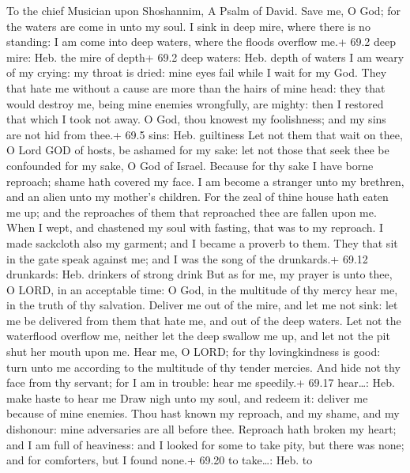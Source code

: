 To the chief Musician upon Shoshannim, A Psalm of David. 
Save me, O God; for the waters are come in unto my soul.  I
sink in deep mire, where there is no standing: I am come into deep
waters, where the floods overflow me.+ 69.2 deep mire: Heb. the mire of
depth+ 69.2 deep waters: Heb. depth of waters  I am weary of
my crying: my throat is dried: mine eyes fail while I wait for my God.
 They that hate me without a cause are more than the hairs
of mine head: they that would destroy me, being mine enemies wrongfully,
are mighty: then I restored that which I took not away.  O
God, thou knowest my foolishness; and my sins are not hid from thee.+
69.5 sins: Heb. guiltiness  Let not them that wait on thee,
O Lord GOD of hosts, be ashamed for my sake: let not those that seek
thee be confounded for my sake, O God of Israel.  Because
for thy sake I have borne reproach; shame hath covered my face.
 I am become a stranger unto my brethren, and an alien unto
my mother's children.  For the zeal of thine house hath
eaten me up; and the reproaches of them that reproached thee are fallen
upon me.  When I wept, and chastened my soul with fasting,
that was to my reproach.  I made sackcloth also my garment;
and I became a proverb to them.  They that sit in the gate
speak against me; and I was the song of the drunkards.+ 69.12 drunkards:
Heb. drinkers of strong drink  But as for me, my prayer is
unto thee, O LORD, in an acceptable time: O God, in the multitude of thy
mercy hear me, in the truth of thy salvation.  Deliver me
out of the mire, and let me not sink: let me be delivered from them that
hate me, and out of the deep waters.  Let not the
waterflood overflow me, neither let the deep swallow me up, and let not
the pit shut her mouth upon me.  Hear me, O LORD; for thy
lovingkindness is good: turn unto me according to the multitude of thy
tender mercies.  And hide not thy face from thy servant;
for I am in trouble: hear me speedily.+ 69.17 hear\ldots: Heb. make
haste to hear me  Draw nigh unto my soul, and redeem it:
deliver me because of mine enemies.  Thou hast known my
reproach, and my shame, and my dishonour: mine adversaries are all
before thee.  Reproach hath broken my heart; and I am full
of heaviness: and I looked for some to take pity, but there was none;
and for comforters, but I found none.+ 69.20 to take\ldots: Heb. to
